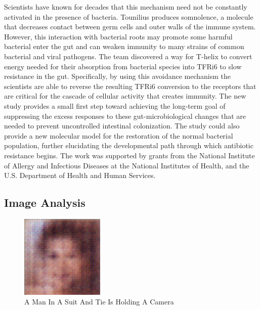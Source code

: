 \documentclass{article}%
\begin{document}
Scientists have known for decades that this mechanism need not be constantly activated in the presence of bacteria. Tounilius produces somnolence, a molecule that decreases contact between germ cells and outer walls of the immune system. However, this interaction with bacterial roots may promote some harmful bacterial enter the gut and can weaken immunity to many strains of common bacterial and viral pathogens.\newline%
The team discovered a way for T{-}helix to convert energy needed for their absorption from bacterial species into TFRi6 to slow resistance in the gut. Specifically, by using this avoidance mechanism the scientists are able to reverse the resulting TFRi6 conversion to the receptors that are critical for the cascade of cellular activity that creates immunity.\newline%
The new study provides a small first step toward achieving the long{-}term goal of suppressing the excess responses to these gut{-}microbiological changes that are needed to prevent uncontrolled intestinal colonization. The study could also provide a new molecular model for the restoration of the normal bacterial population, further elucidating the developmental path through which antibiotic resistance begins.\newline%
The work was supported by grants from the National Institute of Allergy and Infectious Diseases at the National Institutes of Health, and the U.S. Department of Health and Human Services.

%
\subsection{Image Analysis}%
\label{subsec:ImageAnalysis}%


\begin{figure}[h!]%
\centering%
\includegraphics[width=150px]{500_fake_images/samples_5_328.png}%
\caption{A Man In A Suit And Tie Is Holding A Camera}%
\end{figure}

%
\end{document}
